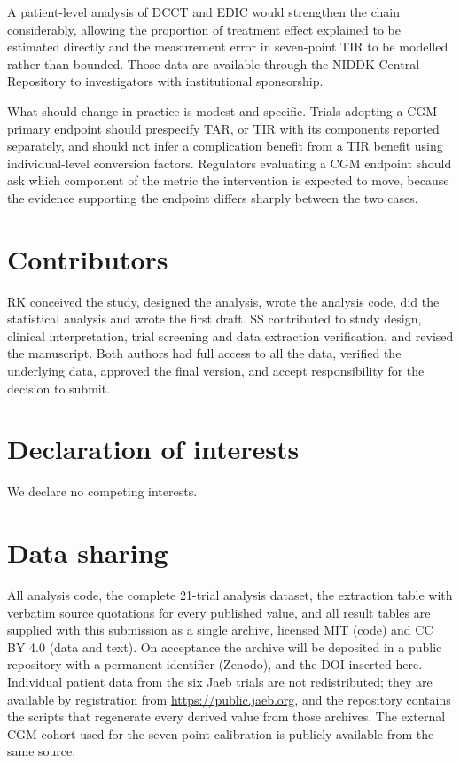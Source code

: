 \documentclass[11pt,a4paper]{article}
\begin{document}
A patient-level analysis of DCCT and EDIC would strengthen the chain considerably, allowing the proportion of
treatment effect explained to be estimated directly and the measurement error in seven-point TIR to be
modelled rather than bounded. Those data are available through the NIDDK Central Repository to investigators
with institutional sponsorship.

What should change in practice is modest and specific. Trials adopting a CGM primary endpoint should
prespecify TAR, or TIR with its components reported separately, and should not infer a complication benefit
from a TIR benefit using individual-level conversion factors. Regulators evaluating a CGM endpoint should ask
which component of the metric the intervention is expected to move, because the evidence supporting the
endpoint differs sharply between the two cases.

\section*{Contributors}
RK conceived the study, designed the analysis, wrote the analysis code, did the statistical analysis and
wrote the first draft. SS contributed to study design, clinical interpretation, trial screening and data
extraction verification, and revised the manuscript. Both authors had full access to all the data, verified
the underlying data, approved the final version, and accept responsibility for the decision to submit.

\section*{Declaration of interests}
We declare no competing interests.

\section*{Data sharing}
All analysis code, the complete 21-trial analysis dataset, the extraction table with verbatim source
quotations for every published value, and all result tables are supplied with this submission as a single
archive, licensed MIT (code) and CC BY 4.0 (data and text). On acceptance the archive will be deposited in a
public repository with a permanent identifier (Zenodo), and the DOI inserted here.
Individual patient data from the six Jaeb trials are not redistributed; they are available
by registration from \url{https://public.jaeb.org}, and the repository contains the scripts that regenerate
every derived value from those archives. The external CGM cohort used for the seven-point calibration is
publicly available from the same source.
\end{document}
